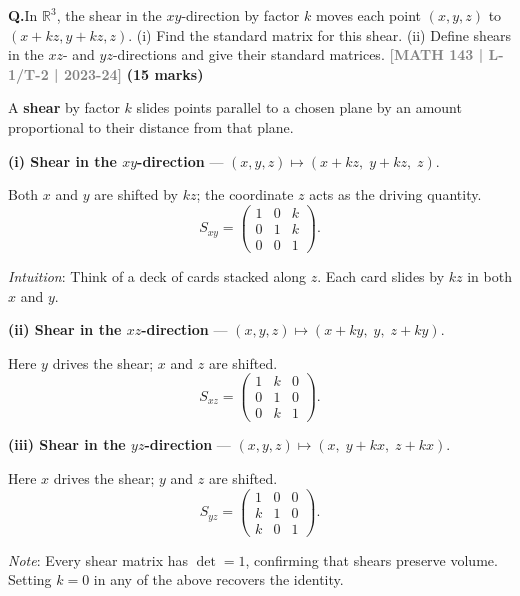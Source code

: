 \documentclass[12pt,a3paper]{article}
\newcommand{\yr}[1]{\hfill\textcolor{gray}{\small\textbf{[#1]}}}
\newcommand{\mk}[1]{\textcolor{orange!70!black}{\small\textbf{(#1 marks)}}}
\newcounter{qnum}
\newcommand{\Q}[1]{%
  \needspace{4\baselineskip}
  \refstepcounter{qnum}
  \vspace{6pt}
  \noindent\textbf{Q\theqnum.}\enspace #1\par
}
\begin{document}
\Q{In $\mathbb{R}^3$, the shear in the $xy$-direction by factor $k$ moves each point $(x,y,z)$ to $(x+kz, y+kz, z)$. (i) Find the standard matrix for this shear. (ii) Define shears in the $xz$- and $yz$-directions and give their standard matrices.
\yr{MATH 143 | L-1/T-2 | 2023-24} \mk{15}}


\begin{tcolorbox}[enhanced,breakable,
  colback=cF!4,colframe=cF,boxrule=0.8pt,arc=5pt,
  title={\textbf{Answer --- Shear Operators in $\mathbb{R}^3$}},
  fonttitle=\bfseries\color{white},colbacktitle=cF]

A \textbf{shear} by factor $k$ slides points parallel to a chosen plane by an amount proportional to their distance from that plane.

\medskip
\textbf{(i) Shear in the $xy$-direction} --- $(x,y,z)\mapsto(x+kz,\;y+kz,\;z)$.

Both $x$ and $y$ are shifted by $kz$; the coordinate $z$ acts as the driving quantity.
\[
S_{xy}=\begin{pmatrix}1&0&k\\0&1&k\\0&0&1\end{pmatrix}.
\]

\textit{Intuition}: Think of a deck of cards stacked along $z$. Each card slides by $kz$ in both $x$ and $y$.

\medskip
\textbf{(ii) Shear in the $xz$-direction} --- $(x,y,z)\mapsto(x+ky,\;y,\;z+ky)$.

Here $y$ drives the shear; $x$ and $z$ are shifted.
\[
S_{xz}=\begin{pmatrix}1&k&0\\0&1&0\\0&k&1\end{pmatrix}.
\]

\textbf{(iii) Shear in the $yz$-direction} --- $(x,y,z)\mapsto(x,\;y+kx,\;z+kx)$.

Here $x$ drives the shear; $y$ and $z$ are shifted.
\[
S_{yz}=\begin{pmatrix}1&0&0\\k&1&0\\k&0&1\end{pmatrix}.
\]

\textit{Note}: Every shear matrix has $\det=1$, confirming that shears preserve volume. Setting $k=0$ in any of the above recovers the identity.

\end{tcolorbox}
\end{document}
